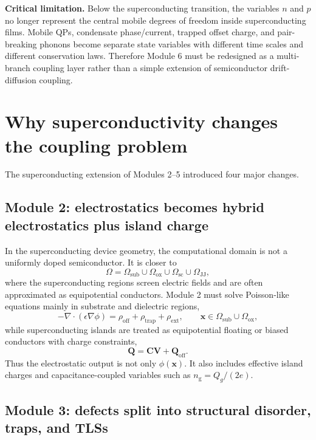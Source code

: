 \documentclass[11pt]{article}
\newcommand{\Om}{\Omega}
\newcommand{\Osub}{\Omega_{\mathrm{sub}}}
\newcommand{\Oox}{\Omega_{\mathrm{ox}}}
\newcommand{\Osc}{\Omega_{\mathrm{sc}}}
\newcommand{\Ojj}{\Omega_{\mathrm{JJ}}}
\newcommand{\x}{\bm{x}}
\newcommand{\phiE}{\phi}
\newcommand{\rhooff}{\rho_{\mathrm{off}}}
\newcommand{\Cmat}{\bm{C}}
\newcommand{\Qvec}{\bm{Q}}
\newcommand{\Vvec}{\bm{V}}
\newcommand{\ngate}{n_{\mathrm{g}}}
\begin{document}
\begin{notebox}
\textbf{Critical limitation.} Below the superconducting transition, the variables \(n\) and \(p\) no longer represent the central mobile degrees of freedom inside superconducting films. Mobile QPs, condensate phase/current, trapped offset charge, and pair-breaking phonons become separate state variables with different time scales and different conservation laws. Therefore Module 6 must be redesigned as a multi-branch coupling layer rather than a simple extension of semiconductor drift-diffusion coupling.
\end{notebox}

\section{Why superconductivity changes the coupling problem}

The superconducting extension of Modules 2--5 introduced four major changes.

\subsection{Module 2: electrostatics becomes hybrid electrostatics plus island charge}

In the superconducting device geometry, the computational domain is not a uniformly doped semiconductor. It is closer to
\begin{equation}
\Om=\Osub\cup\Oox\cup\Osc\cup\Ojj,
\end{equation}
where the superconducting regions screen electric fields and are often approximated as equipotential conductors. Module 2 must solve Poisson-like equations mainly in substrate and dielectric regions,
\begin{equation}
-\nabla\cdot(\epsilon\nabla\phiE)=\rhooff+\rho_{\mathrm{trap}}+\rho_{\mathrm{ext}},
\qquad \x\in \Osub\cup\Oox,
\end{equation}
while superconducting islands are treated as equipotential floating or biased conductors with charge constraints,
\begin{equation}
\Qvec=\Cmat\Vvec+\Qvec_{\mathrm{off}}.
\end{equation}
Thus the electrostatic output is not only \(\phiE(\x)\). It also includes effective island charges and capacitance-coupled variables such as \(\ngate=Q_g/(2e)\).

\subsection{Module 3: defects split into structural disorder, traps, and TLSs}
\end{document}
